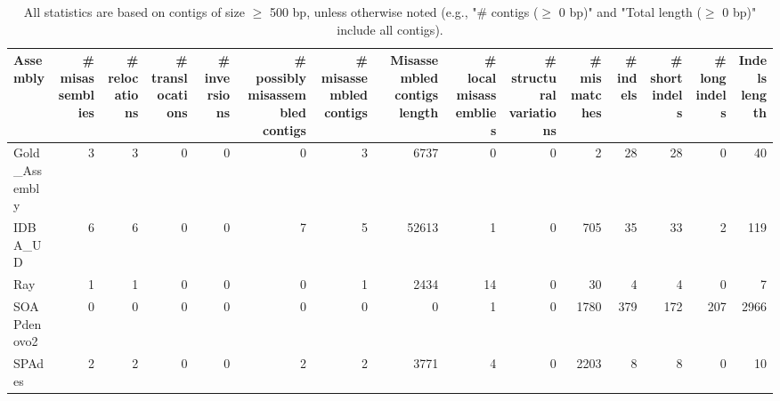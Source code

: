 \documentclass[12pt,a4paper]{article}
\begin{document}
\begin{table}[ht]
\begin{center}
\caption{All statistics are based on contigs of size $\geq$ 500 bp, unless otherwise noted (e.g., "\# contigs ($\geq$ 0 bp)" and "Total length ($\geq$ 0 bp)" include all contigs).}
\begin{tabular}{|l*{14}{|r}|}
\hline
Assembly & \# misassemblies &     \# relocations &     \# translocations &     \# inversions & \# possibly misassembled contigs & \# misassembled contigs & Misassembled contigs length & \# local misassemblies & \# structural variations & \# mismatches & \# indels &     \# short indels &     \# long indels & Indels length \\ \hline
Gold\_Assembly & 3 & 3 & 0 & 0 & 0 & 3 & 6737 & 0 & 0 & 2 & 28 & 28 & 0 & 40 \\ \hline
IDBA\_UD & 6 & 6 & 0 & 0 & 7 & 5 & 52613 & 1 & 0 & 705 & 35 & 33 & 2 & 119 \\ \hline
Ray & 1 & 1 & 0 & 0 & 0 & 1 & 2434 & 14 & 0 & 30 & 4 & 4 & 0 & 7 \\ \hline
SOAPdenovo2 & 0 & 0 & 0 & 0 & 0 & 0 & 0 & 1 & 0 & 1780 & 379 & 172 & 207 & 2966 \\ \hline
SPAdes & 2 & 2 & 0 & 0 & 2 & 2 & 3771 & 4 & 0 & 2203 & 8 & 8 & 0 & 10 \\ \hline
\end{tabular}
\end{center}
\end{table}
\end{document}
